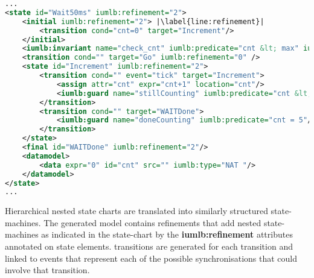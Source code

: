 \begin{lstlisting}[caption={\textbf{Wait50ms} state snippet of SCXML model representation illustrating the use of different SCXML modeling features, as well as, added syntax extensions},label={lst:secBot}, language=xml, escapechar=|, frame=single]
...
<state id="Wait50ms" iumlb:refinement="2">
	<initial iumlb:refinement="2"> |\label{line:refinement}|
		<transition cond="cnt=0" target="Increment"/> 
	</initial>
	<iumlb:invariant name="check_cnt" iumlb:predicate="cnt &lt; max" iumlb:refinement="2"/> |\label{line:invariant}|
	<transition cond="" target="Go" iumlb:refinement="0" />
	<state id="Increment" iumlb:refinement="2">
		<transition cond="" event="tick" target="Increment">
			<assign attr="cnt" expr="cnt+1" location="cnt"/>
			<iumlb:guard name="stillCounting" iumlb:predicate="cnt &lt; 5"/> |\label{line:predicate}|
		</transition>
		<transition cond="" target="WAITDone">
			<iumlb:guard name="doneCounting" iumlb:predicate="cnt = 5"/> |\label{line:guard}|
    	</transition>
	</state>
	<final id="WAITDone" iumlb:refinement="2"/>
	<datamodel>
		<data expr="0" id="cnt" src="" iumlb:type="NAT "/>
	</datamodel>
</state>
...
\end{lstlisting}


Hierarchical nested state charts are translated into similarly structured \iUMLB state-machines. The generated \iUMLB model contains refinements that add nested state-machines as indicated in the  \SCXML state-chart by the \textbf{iumlb:refinement} attributes annotated on state elements. \iUMLB transitions are generated for each \SCXML transition and linked to \EventB events that represent each of the possible synchronisations that could involve that transition.


